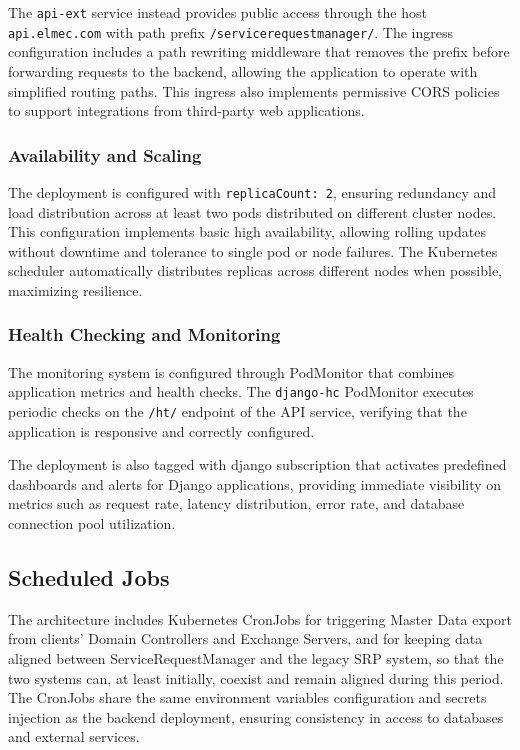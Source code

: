 The \texttt{api-ext} service instead provides public access through the host \texttt{api.elmec.com} with path prefix \texttt{/servicerequestmanager/}. The ingress configuration includes a path rewriting middleware that removes the prefix before forwarding requests to the backend, allowing the application to operate with simplified routing paths. This ingress also implements permissive CORS policies to support integrations from third-party web applications.

\subsubsection{Availability and Scaling}
The deployment is configured with \texttt{replicaCount: 2}, ensuring redundancy and load distribution across at least two pods distributed on different cluster nodes. This configuration implements basic high availability, allowing rolling updates without downtime and tolerance to single pod or node failures. The Kubernetes scheduler automatically distributes replicas across different nodes when possible, maximizing resilience.

\subsubsection{Health Checking and Monitoring}
The monitoring system is configured through PodMonitor that combines application metrics and health checks. The \texttt{django-hc} PodMonitor executes periodic checks on the \texttt{/ht/} endpoint of the API service, verifying that the application is responsive and correctly configured.

The deployment is also tagged with django subscription that activates predefined dashboards and alerts for Django applications, providing immediate visibility on metrics such as request rate, latency distribution, error rate, and database connection pool utilization.

\subsection{Scheduled Jobs}
The architecture includes Kubernetes CronJobs for triggering Master Data export from clients' Domain Controllers and Exchange Servers, and for keeping data aligned between ServiceRequestManager and the legacy SRP system, so that the two systems can, at least initially, coexist and remain aligned during this period.
The CronJobs share the same environment variables configuration and secrets injection as the backend deployment, ensuring consistency in access to databases and external services.

